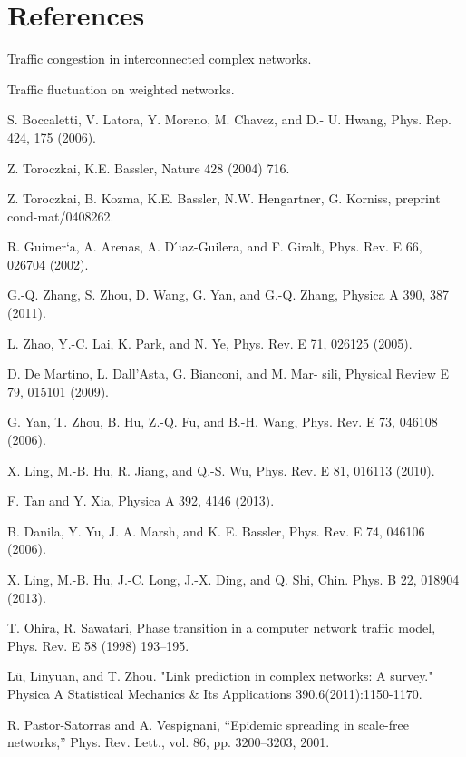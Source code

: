 \documentclass[onecolumn,preprintnumbers,amsmath,amssymb]{revtex4}
\begin{document}
\section*{References}
\begin{thebibliography}{00}

Traffic congestion in interconnected complex networks.

Traffic fluctuation on weighted networks.

S. Boccaletti, V. Latora, Y. Moreno, M. Chavez, and D.- U. Hwang, Phys. Rep. 424, 175 (2006).

Z. Toroczkai, K.E. Bassler, Nature 428 (2004) 716.

Z. Toroczkai, B. Kozma, K.E. Bassler, N.W. Hengartner, G. Korniss, preprint cond-mat/0408262.


R. Guimer`a, A. Arenas, A. D ́ıaz-Guilera, and F. Giralt, Phys. Rev. E 66, 026704 (2002).

G.-Q. Zhang, S. Zhou, D. Wang, G. Yan, and G.-Q.
Zhang, Physica A 390, 387 (2011).

L. Zhao, Y.-C. Lai, K. Park, and N. Ye, Phys. Rev. E 71, 026125 (2005).

D. De Martino, L. Dall’Asta, G. Bianconi, and M. Mar- sili, Physical Review E 79, 015101 (2009).

G. Yan, T. Zhou, B. Hu, Z.-Q. Fu, and B.-H. Wang, Phys. Rev. E 73, 046108 (2006).

X. Ling, M.-B. Hu, R. Jiang, and Q.-S. Wu, Phys. Rev. E 81, 016113 (2010).

F. Tan and Y. Xia, Physica A 392, 4146 (2013).

B. Danila, Y. Yu, J. A. Marsh, and K. E. Bassler, Phys. Rev. E 74, 046106 (2006).

X. Ling, M.-B. Hu, J.-C. Long, J.-X. Ding, and Q. Shi,
Chin. Phys. B 22, 018904 (2013).

T. Ohira, R. Sawatari, Phase transition in a computer network traffic model, Phys. Rev. E 58 (1998) 193–195.

Lü, Linyuan, and T. Zhou. "Link prediction in complex networks: A survey." Physica A Statistical Mechanics \& Its Applications 390.6(2011):1150-1170.

 R. Pastor-Satorras and A. Vespignani, “Epidemic spreading in scale-free networks,” Phys. Rev. Lett., vol. 86, pp. 3200–3203, 2001.


\end{thebibliography}
\end{document}
